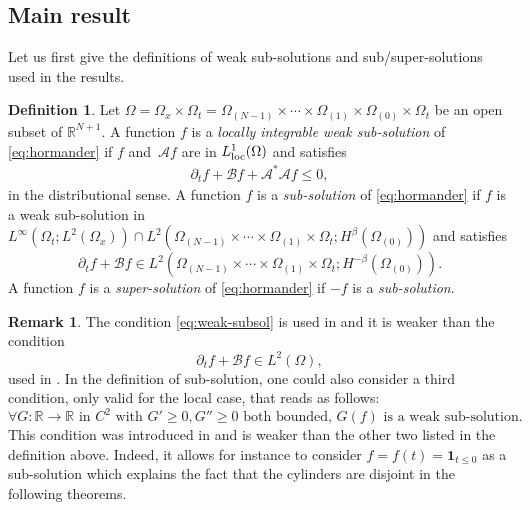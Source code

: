 \documentclass[JEP,XML,SOM,Unicode,NoFloatCountersInSection,published]{cedram}
\newcommand{\loc}{\textup{loc}}
\theoremstyle{definition}
\newtheorem{definition}[theorem]{Definition}
\newtheorem{remark}[theorem]{Remark}
\newcommand{\cA}{{\mathcal A}}
\newcommand{\cB}{{\mathcal B}}
\begin{document}
\subsection{Main result}
\label{sec:aim}
Let us first give the definitions of weak sub-solutions and sub/super-solutions used in the results.
\begin{definition}
\label{def_weak_sol}
Let $\Omega=\Omega_x\times \Omega_t=\Omega_{(N-1)}\times \cdots \times \Omega_{(1)}\times \Omega_{(0)}\times \Omega_t$ be an open subset of $\mathbb{R}^{N+1}$.
A function $f$ is a \emph{locally integrable weak sub-solution} of \eqref{eq:hormander} if $f$ and~$\cA f$ are in $L^{1}_{\loc}(\Omega)$ and satisfies
\begin{align*}
\partial_t f + \cB f + \cA^* \cA f \leq 0,
\end{align*}
in the distributional sense. A function $f$ is a \emph{sub-solution} of \eqref{eq:hormander} if $f$ is a weak sub-solution in $L^\infty(\Omega_{t};L^2(\Omega_x))\cap L^2(\Omega_{(N-1)}\times \cdots \times \Omega_{(1)}\times \Omega_t; H^{\beta}(\Omega_{(0)}))$ and satisfies
\begin{equation}\label{eq:weak-subsol}
\partial_t f + \cB f\in L^2(\Omega_{(N-1)}\times \cdots \times \Omega_{(1)}\times \Omega_t; H^{-\beta}(\Omega_{(0)})).
\end{equation}
A function $f$ is a \emph{super-solution} of \eqref{eq:hormander} if $-f$ is a \emph{sub-solution}.
\end{definition}
\begin{remark}
The condition \eqref{eq:weak-subsol} is used in \cite{GIMV} and it is weaker than the condition
\[
\partial_t f + \cB f\in L^{2}(\Omega),\]
used in \cite{PP}. In the definition of sub-solution, one could also consider a third condition, only valid for the local case, that reads as follows:
\[
\forall G:\mathbb{R}\rightarrow \mathbb{R} \textrm{ in } C^2\textrm{ with } G'\geq 0, G''\geq 0 \textrm{ both bounded, } G(f) \textrm{ is a weak sub-solution}.\]
This condition was introduced in \cite{guerand-mouhot} and is weaker than the other two listed in the definition above. Indeed, it allows for instance to consider $f=f(t)=\mathbf{1}_{t\leq 0}$ as a sub-solution which explains the fact that the cylinders are disjoint in the following theorems.
\end{remark}
\end{document}
